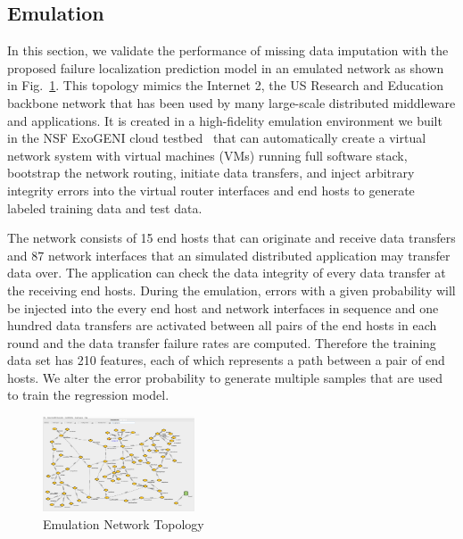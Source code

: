 \subsection{Emulation}
In this section, we validate the performance of missing data imputation with the proposed failure localization prediction 
model in an emulated network as shown in Fig.~\ref{fig:topology}. This topology mimics the Internet 2, the US Research 
and Education backbone network that has been used by many large-scale distributed middleware and applications.
It is created in a high-fidelity emulation environment we built in the NSF ExoGENI cloud testbed~\cite{iris:ictc21} 
that can automatically create a virtual network system with virtual machines (VMs) running full software stack, 
bootstrap the network routing, initiate data transfers, and inject arbitrary integrity errors into the virtual router interfaces 
and end hosts to generate labeled training data and test data.

The network consists of 15 end hosts that can originate and receive data transfers and 87 network interfaces that an simulated 
distributed application may transfer data over. The application can check the data integrity of every data transfer at the receiving end hosts.
During the emulation, errors with a given probability will be injected into the every end host and network interfaces in sequence and one hundred 
data transfers are activated between all pairs of the end hosts in each round and the data transfer failure rates are computed. 
Therefore the training data set has 210 features, each of which represents a path between a pair of end hosts. We alter the error probability to generate 
multiple samples that are used to train the regression model.

\begin{figure}[!ht]
\begin{center}
\includegraphics[width=0.4\textwidth]{./figure/osg_pegasus_request.png}
\end{center}
\caption{Emulation Network Topology}
\label{fig:topology}
\end{figure}

